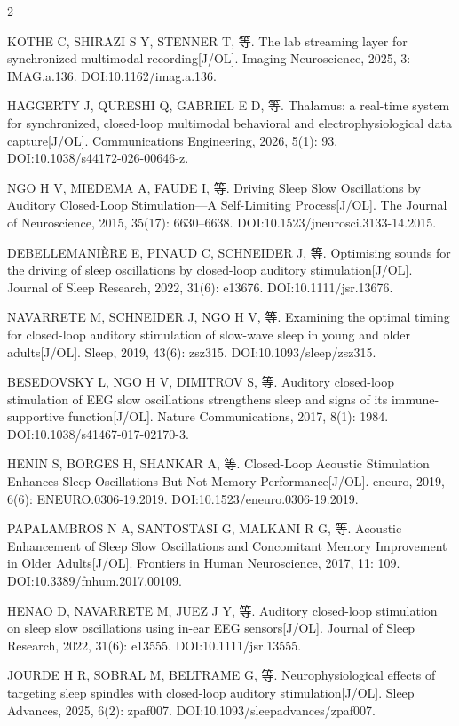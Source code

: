 \documentclass[UTF8,zihao=5,fontset=none]{ctexart}
\begin{document}
\begin{multicols}{2}
{\makebox[25.2pt][l]{[38]}KOTHE C, SHIRAZI S Y, STENNER T, 等. The lab streaming layer for synchronized multimodal recording[J/OL]. Imaging Neuroscience, 2025, 3: IMAG.a.136. DOI:10.1162/imag.a.136.\par
\makebox[25.2pt][l]{[39]}HAGGERTY J, QURESHI Q, GABRIEL E D, 等. Thalamus: a real-time system for synchronized, closed-loop multimodal behavioral and electrophysiological data capture[J/OL]. Communications Engineering, 2026, 5(1): 93. DOI:10.1038/s44172-026-00646-z.\par
\makebox[25.2pt][l]{[40]}NGO H V, MIEDEMA A, FAUDE I, 等. Driving Sleep Slow Oscillations by Auditory Closed-Loop Stimulation—A Self-Limiting Process[J/OL]. The Journal of Neuroscience, 2015, 35(17): 6630--6638. DOI:10.1523/jneurosci.3133-14.2015.\par
\makebox[25.2pt][l]{[41]}DEBELLEMANIÈRE E, PINAUD C, SCHNEIDER J, 等. Optimising sounds for the driving of sleep oscillations by closed-loop auditory stimulation[J/OL]. Journal of Sleep Research, 2022, 31(6): e13676. DOI:10.1111/jsr.13676.\par
\makebox[25.2pt][l]{[42]}NAVARRETE M, SCHNEIDER J, NGO H V, 等. Examining the optimal timing for closed-loop auditory stimulation of slow-wave sleep in young and older adults[J/OL]. Sleep, 2019, 43(6): zsz315. DOI:10.1093/sleep/zsz315.\par
\makebox[25.2pt][l]{[43]}BESEDOVSKY L, NGO H V, DIMITROV S, 等. Auditory closed-loop stimulation of EEG slow oscillations strengthens sleep and signs of its immune-supportive function[J/OL]. Nature Communications, 2017, 8(1): 1984. DOI:10.1038/s41467-017-02170-3.\par
\makebox[25.2pt][l]{[44]}HENIN S, BORGES H, SHANKAR A, 等. Closed-Loop Acoustic Stimulation Enhances Sleep Oscillations But Not Memory Performance[J/OL]. eneuro, 2019, 6(6): ENEURO.0306-19.2019. DOI:10.1523/eneuro.0306-19.2019.\par
\makebox[25.2pt][l]{[45]}PAPALAMBROS N A, SANTOSTASI G, MALKANI R G, 等. Acoustic Enhancement of Sleep Slow Oscillations and Concomitant Memory Improvement in Older Adults[J/OL]. Frontiers in Human Neuroscience, 2017, 11: 109. DOI:10.3389/fnhum.2017.00109.\par
\makebox[25.2pt][l]{[46]}HENAO D, NAVARRETE M, JUEZ J Y, 等. Auditory closed-loop stimulation on sleep slow oscillations using in-ear EEG sensors[J/OL]. Journal of Sleep Research, 2022, 31(6): e13555. DOI:10.1111/jsr.13555.\par
\makebox[25.2pt][l]{[47]}JOURDE H R, SOBRAL M, BELTRAME G, 等. Neurophysiological effects of targeting sleep spindles with closed-loop auditory stimulation[J/OL]. Sleep Advances, 2025, 6(2): zpaf007. DOI:10.1093/sleepadvances/zpaf007.\par
}
\end{multicols}
\end{document}
